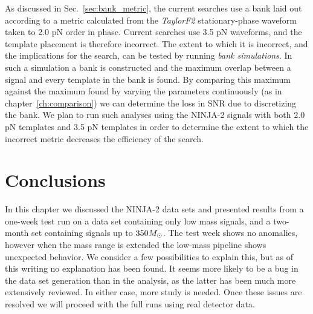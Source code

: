 As discussed in Sec.~\ref{sec:bank_metric}, the current searches use a
bank laid out according to a metric calculated from the
\emph{TaylorF2} stationary-phase waveform taken to 2.0 pN order in
phase.  Current searches use 3.5 pN waveforms, and the template
placement is therefore incorrect.  The extent to which it is
incorrect, and the implications for the search, can be tested by
running \emph{bank simulations}.  In such a simulation a bank is
constructed and the maximum overlap between a signal and every
template in the bank is found.  By comparing this maximum against the
maximum found by varying the parameters continuously (as in
chapter~\ref{ch:comparison}) we can determine the loss in SNR due to
discretizing  the bank.  We plan to run such analyses using the
NINJA-2 signals with both 2.0 pN templates and 3.5 pN templates in
order to determine the extent to which the incorrect metric decreases
the efficiency of the search.

\section{Conclusions}

In this chapter we discussed the NINJA-2 data sets and presented
results from a one-week test run on a data set containing only low
mass signals, and a two-month set containing signals up to $350
M_\odot$.  The test week shows no anomalies, however when the mass range
is extended the low-mass pipeline shows unexpected behavior.  We
consider a few possibilities to explain this, but as of this writing
no explanation has been found.  It seems more likely to be a bug in
the data set generation than in the analysis, as the latter has been
much more extensively reviewed.  In either case, more study is needed.
Once these issues are resolved we will proceed with the full runs
using real detector data.


